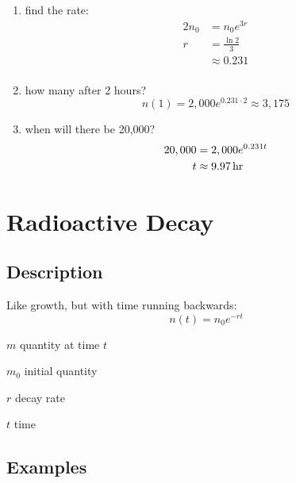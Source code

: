 \documentclass{exam}
\begin{document}
\begin{enumerate}
      \begin{enumerate}[a]
        \item find the rate:
          \begin{align*}
            2n_0 & = n_0 e^{3r} \\
            r    & = \frac{\ln 2}{3} \\
                 & \approx 0.231 \\
          \end{align*}

        \item how many after 2 hours?
          \[
            n(1) = 2,000 e^{0.231 \cdot 2} \approx 3,175
          \]

        \item when will there be 20,000?
          \begin{align*}
            20,000 & = 2,000 e^{0.231 t} \\
            t      & \approx \unit[9.97]{hr} \\
          \end{align*}

      \end{enumerate}
      
  \end{enumerate}

  \section{Radioactive Decay}

  \subsection{Description}
  Like growth, but with time running backwards: 
  \[
    n(t) = n_0 e^{-rt}
  \]

  \begin{itemize*}
    \item $m$ quantity at time $t$
    \item $m_0$ initial quantity
    \item $r$ decay rate
    \item $t$ time
  \end{itemize*}

  \subsection{Examples}
\end{document}
